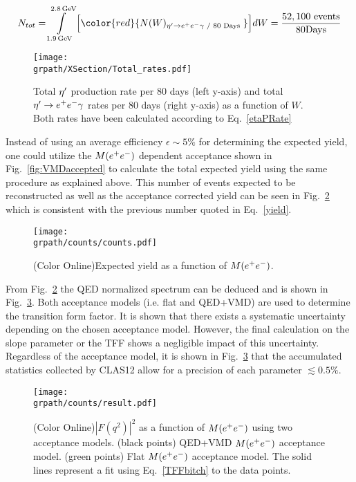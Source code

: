 \begin{equation}
  N_{tot} = \int\limits_{1.9\,\rm{GeV}}^{2.8\,\rm{GeV}} \Big[ {\color{red}{N(W)_{\etaP\rightarrow\epem\gamma\text{ / 80 Days }}}} \Big]dW = \mathrm{\frac{52,100 \ events}{80 Days}}
\label{yield}
\end{equation}


\begin{figure}[h!]\begin{center}
		\texttt{[image: \\grpath/XSection/Total\_rates.pdf]}\\
		\caption[etaP rates]{\label{fig:EtaPRate}{Total $\eta^{\prime}$ production rate per 80 days (left y-axis) and total $\eta^{\prime}\rightarrow e^+e^-\gamma$ rates per 80 days (right y-axis) as a function of $W$. Both rates have been calculated according to Eq.~\ref{etaPRate}}}
\end{center}\end{figure}

Instead of using an average efficiency $\epsilon \sim 5\%$ for determining the expected yield, one could utilize the $M(\epem)$ dependent acceptance shown in Fig.~\ref{fig:VMDaccepted} to calculate the total expected yield using the same procedure as explained above. This number of events expected to be reconstructed as well as the acceptance corrected yield can be seen in Fig.~\ref{fig:counts} which is consistent with the previous number quoted in Eq.~\ref{yield}.

\begin{figure}[h!]\begin{center}
		\texttt{[image: \\grpath/counts/counts.pdf]}
		\caption[Acceptance as a function of $M(\epem)$]{\label{fig:counts}{(Color Online)Expected yield as a function of $M(\epem)$.}}
	\end{center}\end{figure}
	\FloatBarrier
	From Fig.~\ref{fig:counts} the QED normalized spectrum can be deduced and is shown in Fig.~\ref{fig:results}. Both acceptance models (i.e. flat and QED+VMD) are used to determine the transition form factor. It is shown that there exists a systematic uncertainty depending on the chosen acceptance model. However, the final calculation on the slope parameter or the TFF shows a negligible impact of this uncertainty. Regardless of the acceptance model, it is shown in Fig.~\ref{fig:results} that the accumulated statistics collected by CLAS12 allow for a precision of each parameter $\lesssim 0.5\%$. 
	\begin{figure}[h!]\begin{center}
			\texttt{[image: \\grpath/counts/result.pdf]}
			\caption[TFF as a function of $M(\epem)$]{\label{fig:results}{(Color Online)$\left|F(q^2)\right|^2$ as a function of $M(\epem)$ using two acceptance models. (black points) QED+VMD $M(\epem)$ acceptance model. (green points) Flat $M(\epem)$ acceptance model. The solid lines represent a fit using Eq.~\ref{TFFbitch} to the data points.}}
		\end{center}\end{figure}
	\FloatBarrier


